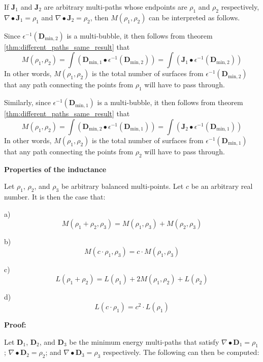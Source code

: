 If \(\mathbf{J}_1\) and \(\mathbf{J}_2\) are arbitrary multi-paths whose endpoints are \(\rho_1\) and \(\rho_2\) respectively, \(\nabla \bullet \mathbf{J}_1 = \rho_1\) and \(\nabla \bullet \mathbf{J}_2 = \rho_2\), then \(M(\rho_1, \rho_2)\) can be interpreted as follows. 

Since \(\epsilon^{-1}(\mathbf{D}_{\text{min},2})\) is a multi-bubble, it then follows from theorem \ref{thm:different_paths_same_result} that 
\[M(\rho_1, \rho_2) = \int (\mathbf{D}_{\text{min},1} \bullet \epsilon^{-1}(\mathbf{D}_{\text{min},2})) = \int (\mathbf{J}_1 \bullet \epsilon^{-1}(\mathbf{D}_{\text{min},2}))\]
In other words, \(M(\rho_1, \rho_2)\) is the total number of surfaces from \(\epsilon^{-1}(\mathbf{D}_{\text{min},2})\) that any path connecting the points from \(\rho_1\) will have to pass through.

Similarly, since \(\epsilon^{-1}(\mathbf{D}_{\text{min},1})\) is a multi-bubble, it then follows from theorem \ref{thm:different_paths_same_result} that 
\[M(\rho_1, \rho_2) = \int (\mathbf{D}_{\text{min},2} \bullet \epsilon^{-1}(\mathbf{D}_{\text{min},1})) = \int (\mathbf{J}_2 \bullet \epsilon^{-1}(\mathbf{D}_{\text{min},1}))\]
In other words, \(M(\rho_1, \rho_2)\) is the total number of surfaces from \(\epsilon^{-1}(\mathbf{D}_{\text{min},1})\) that any path connecting the points from \(\rho_2\) will have to pass through.

\vspace{5mm}

\textbf{Properties of the inductance}

\begin{thm}\label{thm:balanced_multi-point_inductance_properties}
Let \(\rho_1\), \(\rho_2\), and \(\rho_3\) be arbitrary balanced multi-points. Let \(c\) be an arbitrary real number. It is then the case that:

a)
\[M(\rho_1 + \rho_2, \rho_3) = M(\rho_1, \rho_3) + M(\rho_2, \rho_3)\]

b)
\[M(c \cdot \rho_1, \rho_3) = c \cdot M(\rho_1, \rho_3)\]

c)
\[L(\rho_1 + \rho_2) = L(\rho_1) + 2M(\rho_1, \rho_2) + L(\rho_2)\]

d)
\[L(c \cdot \rho_1) = c^2 \cdot L(\rho_1)\]
\end{thm}
\textbf{Proof:}

Let \(\mathbf{D}_1\), \(\mathbf{D}_2\), and \(\mathbf{D}_3\) be the minimum energy multi-paths that satisfy \(\nabla \bullet \mathbf{D}_1 = \rho_1\); \(\nabla \bullet \mathbf{D}_2 = \rho_2\); and \(\nabla \bullet \mathbf{D}_3 = \rho_3\) respectively. The following can then be computed:

